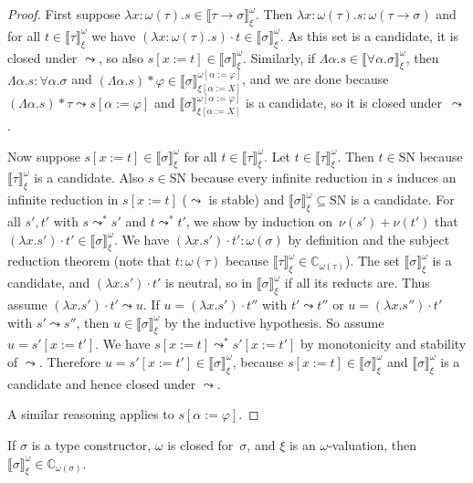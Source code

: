 \documentclass[a4paper,UKenglish,cleveref,autoref,numberwithinsect]{lipics-v2019}
\theoremstyle{definition}
\newcommand{\arrtype}{\rightarrow}
\newcommand{\quant}[2]{\forall #1.#2}
\newcommand{\app}[2]{#1 \cdot #2}
\newcommand{\tapp}[2]{#1 * #2}
\newcommand{\subst}[2]{#1:=#2}
\newcommand{\abs}[2]{\lambda #1.#2}
\newcommand{\tabs}[2]{\Lambda #1.#2}
\newcommand{\arrW}{\leadsto}
\newcommand{\SN}{\mathrm{SN}}
\newcommand{\Cb}{\mathbb{C}}
\newcommand{\val}[3]{\ensuremath{\llbracket#1\rrbracket_{#2}^{#3}}}
\begin{document}
\begin{proof}
  First suppose
  $\abs{x:\omega(\tau)}{s} \in \val{\tau \arrtype
    \sigma}{\xi}{\omega}$. Then
  $\abs{x:\omega(\tau)}{s} : \omega(\tau\arrtype\sigma)$ and for all
  $t \in \val{\tau}{\xi}{\omega}$ we have
  $\app{(\abs{x:\omega(\tau)}{s})}{t} \in \val{\sigma}{\xi}{\omega}$.
  As this set is a candidate, it is closed under $\arrW$, so also
  $s[x:=t] \in \val{\sigma}{\xi}{\omega}$. Similarly, if
  $\tabs{\alpha}{s} \in \val{\quant{\alpha}{\sigma}}{\xi}{\omega}$,
  then $\tabs{\alpha}{s} : \quant{\alpha}{\sigma}$ and
  $\tapp{(\tabs{\alpha}{s})}{\varphi} \in
  \val{\sigma}{\xi[\subst{\alpha}{X}]}{\omega[\subst{\alpha}{\varphi}]}$,
  and we are done because
  $\tapp{(\tabs{\alpha}{s})}{\tau} \arrW s[\alpha:=\varphi]$ and
  $\val{\sigma}{\xi[\subst{\alpha}{X}]}{\omega[\subst{\alpha}{\varphi}]}$
  is a candidate, so it is closed under~$\arrW$.

  Now suppose $s[x:=t] \in \val{\sigma}{\xi}{\omega}$ for all
  $t \in \val{\tau}{\xi}{\omega}$. Let
  $t \in \val{\tau}{\xi}{\omega}$. Then $t \in \SN$ because
  $\val{\tau}{\xi}{\omega}$ is a candidate. Also $s \in \SN$ because
  every infinite reduction in $s$ induces an infinite reduction in
  $s[x:=t]$ ($\arrW$ is stable) and
  $\val{\sigma}{\xi}{\omega} \subseteq \SN$ is a candidate. For all
  $s',t'$ with $s \arrW^* s'$ and $t \arrW^* t'$, we show by
  induction on~$\nu(s') + \nu(t')$ that
  $\app{(\abs{x}{s'})} t' \in \val{\sigma}{\xi}{\omega}$. We have
  $\app{(\abs{x}{s'})} t' : \omega(\sigma)$ by definition and the
  subject reduction theorem (note that $t : \omega(\tau)$ because
  $\val{\tau}{\xi}{\omega} \in \Cb_{\omega(\tau)}$). The set
  $\val{\sigma}{\xi}{\omega}$ is a candidate, and
  $\app{(\abs{x}{s'})}{t'}$ is neutral, so in
  $\val{\sigma}{\xi}{\omega}$ if all its reducts are. Thus assume
  $\app{(\abs{x}{s'})}{t'} \arrW u$. If
  $u = \app{(\abs{x}{s'})}{t''}$ with $t' \arrW t''$ or
  $u = \app{(\abs{x}{s''})}{t'}$ with $s' \arrW s''$, then
  $u \in \val{\sigma}{\xi}{\omega}$ by the inductive hypothesis. So
  assume $u = s'[x:=t']$. We have $s[x:=t] \arrW^* s'[x:=t']$ by
  monotonicity and stability of $\arrW$. Therefore
  $u = s'[x:=t'] \in \val{\sigma}{\xi}{\omega}$, because
  $s[x:=t] \in \val{\sigma}{\xi}{\omega}$ and
  $\val{\sigma}{\xi}{\omega}$ is a candidate and hence closed under
  $\arrW$.

  A similar reasoning applies to $s[\alpha:=\varphi]$.
\end{proof}

\begin{lemma}\label{lem_val_computable}
  If $\sigma$ is a type constructor, $\omega$ is closed for~$\sigma$,
  and $\xi$ is an $\omega$-valuation, then $\val{\sigma}{\xi}{\omega}
  \in \Cb_{\omega(\sigma)}$.
\end{lemma}
\end{document}
